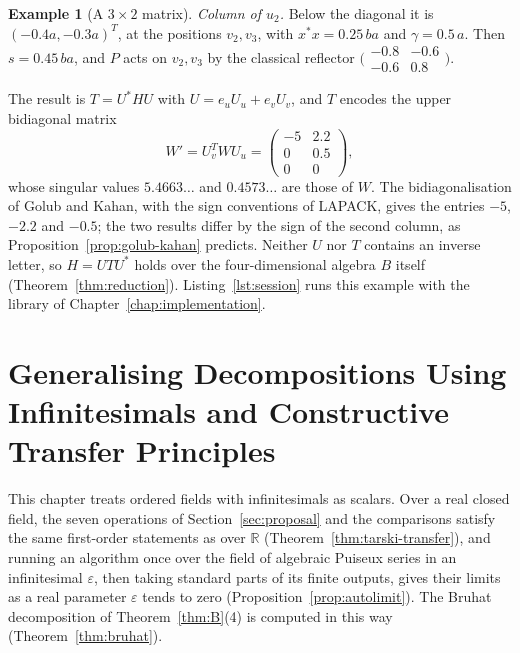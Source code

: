 \documentclass[12pt, a4paper]{report}
\theoremstyle{plain}
\theoremstyle{definition}
\newtheorem{example}[theorem]{Example}
\theoremstyle{remark}
\theoremstyle{plain}
\newcommand{\RR}{\mathbb{R}}
\begin{document}
\begin{example}[A $3\times2$ matrix]
\emph{Column of $u_2$.} Below the diagonal it is $(-0.4a,-0.3a)^T$, at the positions $v_2,v_3$, with $x^*x=0.25\,ba$ and $\gamma=0.5\,a$. Then $s=0.45\,ba$, and $P$ acts on $v_2,v_3$ by the classical reflector $\bigl(\begin{smallmatrix}-0.8&-0.6\\-0.6&0.8\end{smallmatrix}\bigr)$.

The result is $T=U^*HU$ with $U=e_uU_u+e_vU_v$, and $T$ encodes the upper bidiagonal matrix
\[ W'=U_v^TWU_u=\begin{pmatrix}-5&2.2\\0&0.5\\0&0\end{pmatrix}, \]
whose singular values $5.4663\ldots$ and $0.4573\ldots$ are those of $W$. The bidiagonalisation of Golub and Kahan, with the sign conventions of LAPACK, gives the entries $-5$, $-2.2$ and $-0.5$; the two results differ by the sign of the second column, as Proposition~\ref{prop:golub-kahan} predicts. Neither $U$ nor $T$ contains an inverse letter, so $H=UTU^*$ holds over the four-dimensional algebra $B$ itself (Theorem~\ref{thm:reduction}). Listing~\ref{lst:session} runs this example with the library of Chapter~\ref{chap:implementation}.
\end{example}
\chapter[Generalising Decompositions Using Infinitesimals\texorpdfstring{\protect\newline}{ } and Constructive Transfer Principles]{Generalising Decompositions Using Infinitesimals and Constructive Transfer Principles}
\label{chap:infinitesimals}

This chapter treats ordered fields with infinitesimals as scalars. Over a real closed field, the seven operations of Section~\ref{sec:proposal} and the comparisons satisfy the same first-order statements as over $\RR$ (Theorem~\ref{thm:tarski-transfer}), and running an algorithm once over the field of algebraic Puiseux series in an infinitesimal $\varepsilon$, then taking standard parts of its finite outputs, gives their limits as a real parameter $\varepsilon$ tends to zero (Proposition~\ref{prop:autolimit}). The Bruhat decomposition of Theorem~\ref{thm:B}(4) is computed in this way (Theorem~\ref{thm:bruhat}).
\end{document}
